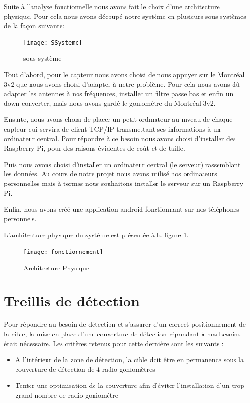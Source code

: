Suite à l'analyse fonctionnelle nous avons fait le choix d'une architecture physique.
Pour cela nous avons découpé notre système en plusieurs sous-systèmes de la façon suivante:

\begin{figure}[h]
  \centering
  \texttt{[image: SSysteme]}
  \caption{sous-système}
\end{figure}

Tout d'abord, pour le capteur nous avons choisi de nous appuyer sur le Montréal 3v2 que nous avons choisi d'adapter à notre problème. Pour cela nous avons dû adapter les antennes à nos fréquences, installer un filtre passe bas et enfin un down converter, mais nous avons gardé le goniomètre du Montréal 3v2.

Ensuite, nous avons choisi de placer un petit ordinateur au niveau de chaque capteur qui servira de client TCP/IP transmettant ses informations à un ordinateur central. Pour répondre à ce besoin nous avons choisi d'installer des Raspberry Pi, pour des raisons évidentes de coût et de taille.

Puis nous avons choisi d'installer un ordinateur central (le serveur) rassemblant les données. Au cours de notre projet nous avons utilisé nos ordinateurs personnelles mais à termes nous souhaitons installer le serveur sur un Raspberry Pi.

Enfin, nous avons créé une application android fonctionnant sur nos téléphones personnels.


L'architecture physique du système est présentée à la figure \ref{fig:arch_phys}.

\begin{figure}[h]
  \centering
  \texttt{[image: fonctionnement]}
  \caption{Architecture Physique}
  \label{fig:arch_phys}
\end{figure}



\section{Treillis de détection}

Pour répondre au besoin de détection et s’assurer d’un correct positionnement de la cible, la mise en
place d’une couverture de détection répondant à nos besoins était nécessaire. Les critères retenus
pour cette dernière sont les suivants :

\begin{itemize}
\item A l’intérieur de la zone de détection, la cible doit être en permanence sous la couverture de détection de 4 radio-goniomètres
\item Tenter une optimisation de la couverture afin d’éviter l’installation d’un trop grand
nombre de radio-goniomètre
\end{itemize}

